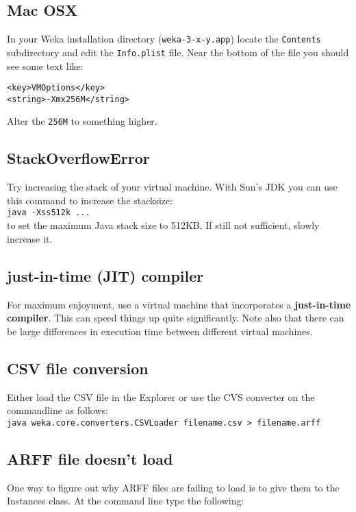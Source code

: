 \subsection{Mac OSX}
In your Weka installation directory (\verb=weka-3-x-y.app=) locate the \verb=Contents= subdirectory and edit the
\verb=Info.plist= file. Near the bottom of the file you should see some text like:

\begin{verbatim}
<key>VMOptions</key>
<string>-Xmx256M</string>
\end{verbatim}

\noindent Alter the \verb=256M= to something higher.

\subsection{StackOverflowError}
Try increasing the stack of your virtual machine. With Sun's JDK you
can use this command to increase the stacksize:\\

\verb=java -Xss512k ...=\\

\noindent to set the maximum Java stack size to 512KB. If still not
sufficient, slowly increase it.

\subsection{just-in-time (JIT) compiler}
For maximum enjoyment, use a virtual machine that incorporates a
\textbf{just-in-time compiler}. This can speed things up quite
significantly. Note also that there can be large differences in
execution time between different virtual machines.

\subsection{CSV file conversion}
Either load the CSV file in the Explorer or use the CVS converter on
the commandline as follows:\\

\verb=java weka.core.converters.CSVLoader filename.csv > filename.arff=\\

\subsection{ARFF file doesn't load}
One way to figure out why ARFF files are failing to load is to give
them to the Instances class. At the command line type the following:\\

